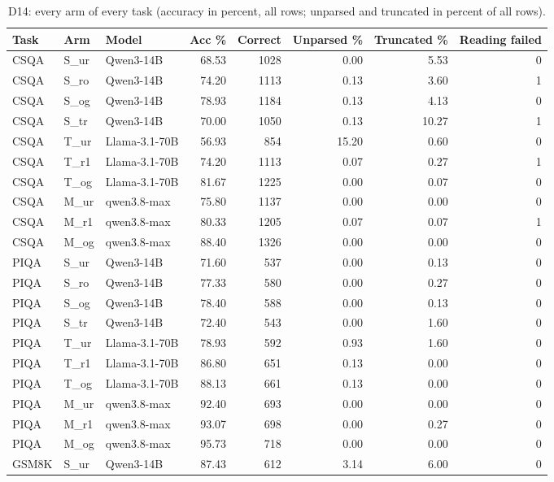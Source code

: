 \begin{table}[t]
\centering
\small
\caption{D14: every arm of every task (accuracy in percent, all rows; unparsed and truncated in percent of all rows).}
\label{tab:d14-arms}
\begin{tabular}{lllrrrrr}
\toprule
Task & Arm & Model & Acc \% & Correct & Unparsed \% & Truncated \% & Reading failed \\
\midrule
CSQA & S\_ur & Qwen3-14B & 68.53 & 1028 & 0.00 & 5.53 & 0 \\
CSQA & S\_ro & Qwen3-14B & 74.20 & 1113 & 0.13 & 3.60 & 1 \\
CSQA & S\_og & Qwen3-14B & 78.93 & 1184 & 0.13 & 4.13 & 0 \\
CSQA & S\_tr & Qwen3-14B & 70.00 & 1050 & 0.13 & 10.27 & 1 \\
CSQA & T\_ur & Llama-3.1-70B & 56.93 & 854 & 15.20 & 0.60 & 0 \\
CSQA & T\_r1 & Llama-3.1-70B & 74.20 & 1113 & 0.07 & 0.27 & 1 \\
CSQA & T\_og & Llama-3.1-70B & 81.67 & 1225 & 0.00 & 0.07 & 0 \\
CSQA & M\_ur & qwen3.8-max & 75.80 & 1137 & 0.00 & 0.00 & 0 \\
CSQA & M\_r1 & qwen3.8-max & 80.33 & 1205 & 0.07 & 0.07 & 1 \\
CSQA & M\_og & qwen3.8-max & 88.40 & 1326 & 0.00 & 0.00 & 0 \\
PIQA & S\_ur & Qwen3-14B & 71.60 & 537 & 0.00 & 0.13 & 0 \\
PIQA & S\_ro & Qwen3-14B & 77.33 & 580 & 0.00 & 0.27 & 0 \\
PIQA & S\_og & Qwen3-14B & 78.40 & 588 & 0.00 & 0.13 & 0 \\
PIQA & S\_tr & Qwen3-14B & 72.40 & 543 & 0.00 & 1.60 & 0 \\
PIQA & T\_ur & Llama-3.1-70B & 78.93 & 592 & 0.93 & 1.60 & 0 \\
PIQA & T\_r1 & Llama-3.1-70B & 86.80 & 651 & 0.13 & 0.00 & 0 \\
PIQA & T\_og & Llama-3.1-70B & 88.13 & 661 & 0.13 & 0.00 & 0 \\
PIQA & M\_ur & qwen3.8-max & 92.40 & 693 & 0.00 & 0.00 & 0 \\
PIQA & M\_r1 & qwen3.8-max & 93.07 & 698 & 0.00 & 0.27 & 0 \\
PIQA & M\_og & qwen3.8-max & 95.73 & 718 & 0.00 & 0.00 & 0 \\
GSM8K & S\_ur & Qwen3-14B & 87.43 & 612 & 3.14 & 6.00 & 0 \\

\end{tabular}
\end{table}
